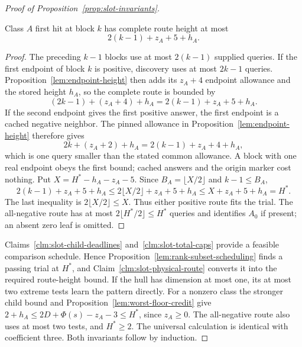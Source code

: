 \begin{proof}[Proof of Proposition~\ref{prop:slot-invariants}]
\begin{claim}
\label{clm:slot-physical-route}
Class $A$ first hit at block $k$ has complete route height at most
\begin{equation}\label{eq:slot-block-allowance}
 2(k-1)+z_A+5+h_A.
\end{equation}
\end{claim}
\begin{proof}
The preceding $k-1$ blocks use at most $2(k-1)$ supplied queries.
If the first endpoint of block $k$ is positive, discovery uses at
most $2k-1$ queries. Proposition~\ref{lem:endpoint-height} then
adds its $z_A+4$ endpoint allowance and the stored height $h_A$, so
the complete route is bounded by
\[
 (2k-1)+(z_A+4)+h_A=2(k-1)+z_A+5+h_A.
\]
If the second endpoint gives the first positive answer, the first
endpoint is a cached negative neighbor. The pinned allowance in
Proposition~\ref{lem:endpoint-height} therefore gives
\[
 2k+(z_A+2)+h_A=2(k-1)+z_A+4+h_A,
\]
which is one query smaller than the stated common allowance.
A block with one real endpoint obeys the first bound; cached answers
and the origin marker cost nothing. Put $X=H^*-h_A-z_A-5$.
Since $B_A=\lfloor X/2\rfloor$ and $k-1\le B_A$,
\[
 2(k-1)+z_A+5+h_A
 \le2\lfloor X/2\rfloor+z_A+5+h_A
 \le X+z_A+5+h_A=H^*.
\]
The last inequality is $2\lfloor X/2\rfloor\le X$.
Thus either positive route fits the trial. The all-negative route has at most
$2\lfloor H^*/2\rfloor\le H^*$ queries and identifies $A_0$ if
present; an absent zero leaf is omitted.
\end{proof}
Claims~\ref{clm:slot-child-deadlines} and~\ref{clm:slot-total-caps}
provide a feasible comparison schedule. Hence
Proposition~\ref{lem:rank-subset-scheduling} finds a passing trial at
$H^*$, and Claim~\ref{clm:slot-physical-route} converts it into the
required route-height bound.
If the hull has dimension at most one, its at most two extreme tests
learn the pattern directly. For a nonzero class the stronger child
bound and Proposition~\ref{lem:worst-floor-credit} give
$2+h_A\le2D+\Phi(s)-z_A-3\le H^*$, since $z_A\ge0$.
The all-negative route also uses at most two tests, and $H^*\ge2$.
The universal calculation is identical with coefficient three.
Both invariants follow by induction.
\end{proof}

